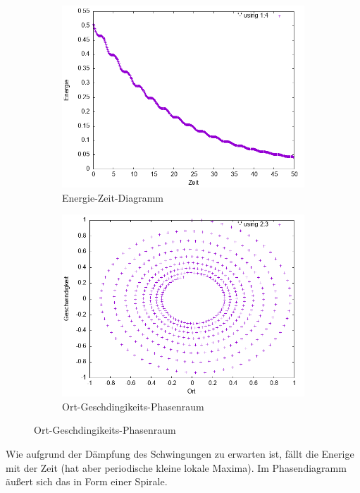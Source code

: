 \documentclass[
    oneside,
    ngerman,
    footinclude=false,
    captions=tableheading,
    DIV=12
]{scrartcl}
\begin{document}
            \begin{figure}[H]
            \centering
            \begin{subfigure}[b]{0.45\textwidth}
                \centering
                \includegraphics[width=\textwidth]{Bilddateien/LLA1(a)-01-E.png}
                \caption{Energie-Zeit-Diagramm}
                \label{fig:LLA1(a)-01-0-E}
            \end{subfigure}
            \hfill
            \begin{subfigure}[b]{0.45\textwidth}
                \centering
                \includegraphics[width=\textwidth]{Bilddateien/LLA1(a)-01-0-xv.png}
                \caption{Ort-Geschdingikeits-Phasenraum}
                \label{fig:LLA1(a)-01-0-xv}
            \end{subfigure}
            \end{figure}
            Wie aufgrund der Dämpfung des Schwingungen zu erwarten ist, fällt die Enerige mit der Zeit (hat aber periodische kleine lokale Maxima). Im Phasendiagramm äußert sich das in Form einer Spirale.
\end{document}
